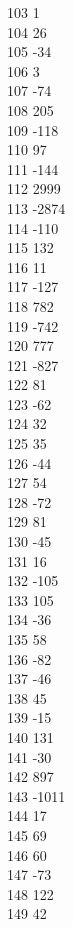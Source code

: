 { 103	1 \\
 104	26 \\
 105	-34 \\
 106	3 \\
 107	-74 \\
 108	205 \\
 109	-118 \\
 110	97 \\
 111	-144 \\
 112	2999 \\
 113	-2874 \\
 114	-110 \\
 115	132 \\
 116	11 \\
 117	-127 \\
 118	782 \\
 119	-742 \\
 120	777 \\
 121	-827 \\
 122	81 \\
 123	-62 \\
 124	32 \\
 125	35 \\
 126	-44 \\
 127	54 \\
 128	-72 \\
 129	81 \\
 130	-45 \\
 131	16 \\
 132	-105 \\
 133	105 \\
 134	-36 \\
 135	58 \\
 136	-82 \\
 137	-46 \\
 138	45 \\
 139	-15 \\
 140	131 \\
 141	-30 \\
 142	897 \\
 143	-1011 \\
 144	17 \\
 145	69 \\
 146	60 \\
 147	-73 \\
 148	122 \\
 149	42 \\
}
